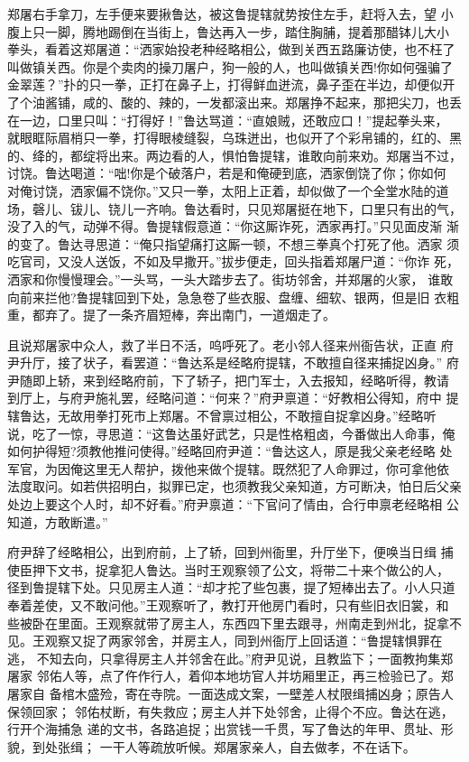 郑屠右手拿刀，左手便来要揪鲁达，被这鲁提辖就势按住左手，赶将入去，望
小腹上只一脚，腾地踢倒在当街上，鲁达再入一步，踏住胸脯，提着那醋钵儿大小
拳头，看着这郑屠道：“洒家始投老种经略相公，做到关西五路廉访使，也不枉了
叫做镇关西。你是个卖肉的操刀屠户，狗一般的人，也叫做镇关西!你如何强骗了
金翠莲？”扑的只一拳，正打在鼻子上，打得鲜血迸流，鼻子歪在半边，却便似开
了个油酱铺，咸的、酸的、辣的，一发都滚出来。郑屠挣不起来，那把尖刀，也丢
在一边，口里只叫：“打得好！”鲁达骂道：“直娘贼，还敢应口！”提起拳头来，
就眼眶际眉梢只一拳，打得眼棱缝裂，乌珠迸出，也似开了个彩帛铺的，红的、黑
的、绛的，都绽将出来。两边看的人，惧怕鲁提辖，谁敢向前来劝。郑屠当不过，
讨饶。鲁达喝道：“咄!你是个破落户，若是和俺硬到底，洒家倒饶了你；你如何
对俺讨饶，洒家偏不饶你。”又只一拳，太阳上正着，却似做了一个全堂水陆的道
场，磬儿、钹儿、铙儿一齐响。鲁达看时，只见郑屠挺在地下，口里只有出的气，
没了入的气，动弹不得。鲁提辖假意道：“你这厮诈死，洒家再打。”只见面皮渐
渐的变了。鲁达寻思道：“俺只指望痛打这厮一顿，不想三拳真个打死了他。洒家
须吃官司，又没人送饭，不如及早撒开。”拔步便走，回头指着郑屠尸道：“你诈
死，洒家和你慢慢理会。”一头骂，一头大踏步去了。街坊邻舍，并郑屠的火家，
谁敢向前来拦他?鲁提辖回到下处，急急卷了些衣服、盘缠、细软、银两，但是旧
衣粗重，都弃了。提了一条齐眉短棒，奔出南门，一道烟走了。

且说郑屠家中众人，救了半日不活，呜呼死了。老小邻人径来州衙告状，正直
府尹升厅，接了状子，看罢道：“鲁达系是经略府提辖，不敢擅自径来捕捉凶身。”
府尹随即上轿，来到经略府前，下了轿子，把门军士，入去报知，经略听得，教请
到厅上，与府尹施礼罢，经略问道：“何来？”府尹禀道：“好教相公得知，府中
提辖鲁达，无故用拳打死市上郑屠。不曾禀过相公，不敢擅自捉拿凶身。”经略听
说，吃了一惊，寻思道：“这鲁达虽好武艺，只是性格粗卤，今番做出人命事，俺
如何护得短?须教他推问使得。”经略回府尹道：“鲁达这人，原是我父亲老经略
处军官，为因俺这里无人帮护，拨他来做个提辖。既然犯了人命罪过，你可拿他依
法度取问。如若供招明白，拟罪已定，也须教我父亲知道，方可断决，怕日后父亲
处边上要这个人时，却不好看。”府尹禀道：“下官问了情由，合行申禀老经略相
公知道，方敢断遣。”

府尹辞了经略相公，出到府前，上了轿，回到州衙里，升厅坐下，便唤当日缉
捕使臣押下文书，捉拿犯人鲁达。当时王观察领了公文，将带二十来个做公的人，
径到鲁提辖下处。只见房主人道：“却才拕了些包裹，提了短棒出去了。小人只道
奉着差使，又不敢问他。”王观察听了，教打开他房门看时，只有些旧衣旧裳，和
些被卧在里面。王观察就带了房主人，东西四下里去跟寻，州南走到州北，捉拿不
见。王观察又捉了两家邻舍，并房主人，同到州衙厅上回话道：“鲁提辖惧罪在逃，
不知去向，只拿得房主人并邻舍在此。”府尹见说，且教监下；一面教拘集郑屠家
邻佑人等，点了仵作行人，着仰本地坊官人并坊厢里正，再三检验已了。郑屠家自
备棺木盛殓，寄在寺院。一面迭成文案，一壁差人杖限缉捕凶身；原告人保领回家；
邻佑杖断，有失救应；房主人并下处邻舍，止得个不应。鲁达在逃，行开个海捕急
递的文书，各路追捉；出赏钱一千贯，写了鲁达的年甲、贯址、形貌，到处张缉；
一干人等疏放听候。郑屠家亲人，自去做孝，不在话下。

